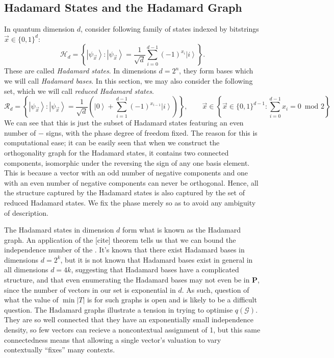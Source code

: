 \documentclass{amsart}
\theoremstyle{definition}
\newcommand{\ket}[1]{{\left\vert{#1}\right\rangle}}
\begin{document}

\subsection{Hadamard States and the Hadamard Graph}

In quantum dimension $d$, consider following family of states indexed by bitstrings $\vec{x}\in\{0,1\}^d$:
\begin{equation}
\mathcal{H}_d=\left\{ \ket{\psi_{\vec{x}}}:\ket{\psi_{\vec{x}}} = \frac{1}{\sqrt{d}}\sum_{i=0}^{d-1}(-1)^{x_i}\ket{i}  \right\}.
\end{equation}
These are called \emph{Hadamard states}. In dimensions $d=2^n$, they form bases which we will call \emph{Hadamard bases}. In this section, we may also consider the following set, which we will call \emph{reduced Hadamard states}.
\begin{equation}
\mathcal{R}_d=\left\{ \ket{\psi_{\vec{x}}}:\ket{\psi_{\vec{x}}} = \frac{1}{\sqrt{d}}\left(\ket{0}+\sum_{i=1}^{d-1}(-1)^{x_{i-1}}\ket{i}  \right)\right\}, \qquad\vec{x}\in\left\{\vec{x}\in\{0,1\}^{d-1}:\sum_{i=0}^{d-1} x_i =0 \enspace \mbox{mod 2}\right\}
\end{equation}
We can see that this is just the subset of Hadamard states featuring an even number of $-$ signs, with the phase degree of freedom fixed. The reason for this is computational ease; it can be easily seen that when we construct the orthogonality graph for the Hadamard states, it contains two connected components, isomorphic under the reversing the sign of any one basis element. This is because a vector with an odd number of negative components and one with an even number of negative components can never be orthogonal. Hence, all the structure captured by the Hadamard states is also captured by the set of reduced Hadamard states. We fix the phase merely so as to avoid any ambiguity of description.

The Hadamard states in dimension $d$ form what is known as the Hadamard graph. An application of the [cite] theorem tells us that we can bound the independence number of the . It's known that there exist Hadamard bases in dimensions $d=2^k$, but it is not known that Hadamard bases exist in general in all dimensions $d=4k$, suggesting that Hadamard bases have a complicated structure, and that even enumerating the Hadamard bases may not even be in \textbf{P}, since the number of vectors in our set is exponential in $d$. As such, question of what the value of $\min|T|$  is for such graphs is open and is likely to be a difficult question. The Hadamard graphs illustrate a tension in trying to optimise $q(\mathcal{G})$. They are so well connected that they have an exponentially small independence density, so few vectors can recieve a noncontextual assignment of 1, but this same connectedness means that allowing a single vector's valuation to vary contextually ``fixes'' many contexts.
\end{document}

